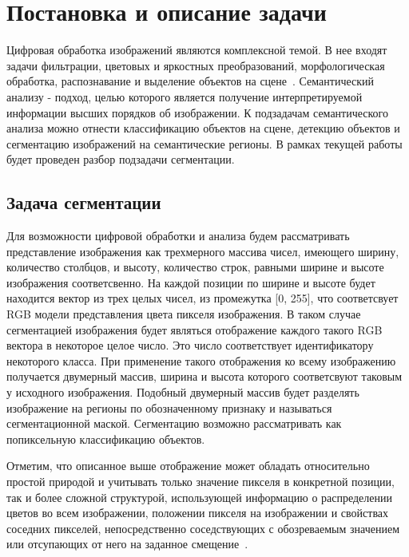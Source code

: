 \section{Постановка и описание задачи}
\label{task_description_start}

Цифровая обработка изображений являются комплексной темой. В нее входят задачи фильтрации, цветовых и яркостных преобразований, морфологическая обработка, распознавание и выделение объектов на сцене~\autocite{gonzalez2008digital}. Семантический анализу - подход, целью которого является получение интерпретируемой информации высших порядков об изображении. К подзадачам семантического анализа можно отнести классификацию объектов на сцене, детекцию объектов и сегментацию изображений на семантические регионы. В рамках текущей работы будет проведен разбор подзадачи сегментации.

\subsection{Задача сегментации}

Для возможности цифровой обработки и анализа будем рассматривать представление изображения как трехмерного массива чисел, имеющего ширину, количество столбцов, и высоту, количество строк, равными ширине и высоте изображения соответсвенно. На каждой позиции по ширине и высоте будет находится вектор из трех целых чисел, из промежутка [0, 255], что соответсвует RGB модели представления цвета пикселя изображения. В таком случае сегментацией изображения будет являться отображение каждого такого RGB вектора в некоторое целое число. Это число соответствует идентификатору некоторого класса. При применение такого отображения ко всему изображению получается двумерный массив, ширина и высота которого соответсвуют таковым у исходного изображения. Подобный двумерный массив будет разделять изображение на регионы по обозначенному признаку и называться сегментационной маской. Сегментацию возможно рассматривать как попиксельную классификацию объектов.

Отметим, что описанное выше отображение может обладать относительно простой природой и учитывать только значение пикселя в конкретной позиции, так и более сложной структурой, использующей информацию о распределении цветов во всем изображении, положении пикселя на изображении и свойствах соседних пикселей, непосредственно соседствующих с обозреваемым значением или отсупающих от него на заданное смещение~\autocite{liu2018recent}.

